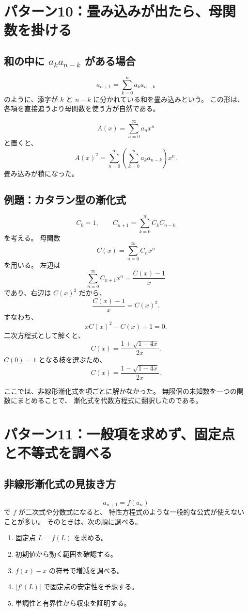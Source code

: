 \section{パターン10：畳み込みが出たら、母関数を掛ける}

\subsection{和の中に $a_ka_{n-k}$ がある場合}

\[
  a_{n+1}=\sum_{k=0}^{n}a_ka_{n-k}
\]
のように、添字が $k$ と $n-k$ に分かれている和を畳み込みという。
この形は、各項を直接追うより母関数を使う方が自然である。

\[
  A(x)=\sum_{n=0}^{\infty}a_nx^n
\]
と置くと、
\[
  A(x)^2
  =\sum_{n=0}^{\infty}
  \left(\sum_{k=0}^{n}a_ka_{n-k}\right)x^n.
\]
畳み込みが積になった。

\subsection{例題：カタラン型の漸化式}

\[
  C_0=1,\qquad
  C_{n+1}=\sum_{k=0}^{n}C_kC_{n-k}
\]
を考える。
母関数
\[
  C(x)=\sum_{n=0}^{\infty}C_nx^n
\]
を用いる。
左辺は
\[
  \sum_{n=0}^{\infty}C_{n+1}x^{n}
  =\frac{C(x)-1}{x}
\]
であり、右辺は $C(x)^2$ だから、
\[
  \frac{C(x)-1}{x}=C(x)^2.
\]
すなわち、
\[
  xC(x)^2-C(x)+1=0.
\]
二次方程式として解くと、
\[
  C(x)=\frac{1\pm\sqrt{1-4x}}{2x}.
\]
$C(0)=1$ となる枝を選ぶため、
\[
  C(x)=\frac{1-\sqrt{1-4x}}{2x}.
\]

ここでは、非線形漸化式を項ごとに解かなかった。
無限個の未知数を一つの関数にまとめることで、
漸化式を代数方程式に翻訳したのである。

\section{パターン11：一般項を求めず、固定点と不等式を調べる}

\subsection{非線形漸化式の見抜き方}

\[
  a_{n+1}=f(a_n)
\]
で $f$ が二次式や分数式になると、
特性方程式のような一般的な公式が使えないことが多い。
そのときは、次の順に調べる。

\begin{enumerate}
  \item 固定点 $L=f(L)$ を求める。
  \item 初期値から動く範囲を確認する。
  \item $f(x)-x$ の符号で増減を調べる。
  \item $|f'(L)|$ で固定点の安定性を予想する。
  \item 単調性と有界性から収束を証明する。
\end{enumerate}

